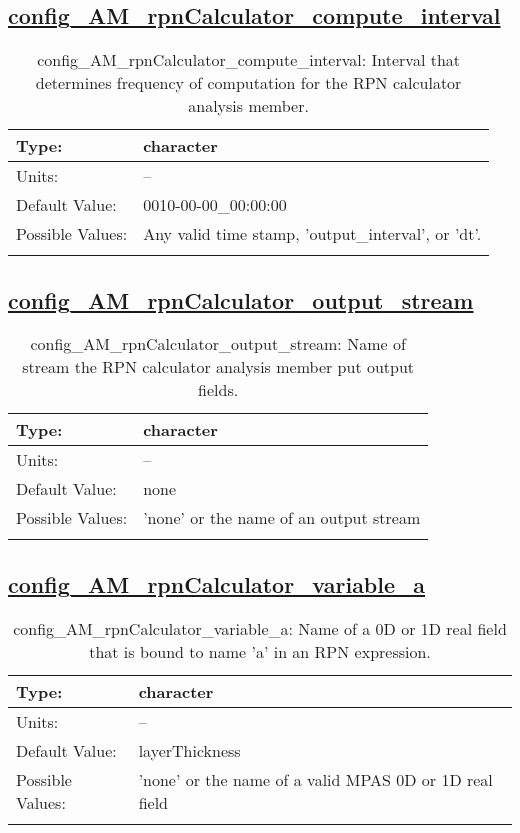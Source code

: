 \subsection[config\_AM\_rpnCalculator\_compute\_interval]{\hyperref[sec:nm_tab_AM_rpnCalculator]{config\_AM\_rpnCalculator\_compute\_interval}}
\label{subsec:nm_sec_config_AM_rpnCalculator_compute_interval}
\begin{center}
\begin{longtable}{| p{2.0in} || p{4.0in} |}
    \hline
    Type: & character \\
    \hline
    Units: & -- \\
    \hline
    Default Value: & 0010-00-00\_00:00:00 \\
    \hline
    Possible Values: & Any valid time stamp, 'output\_interval', or 'dt'. \\
    \hline
    \caption{config\_AM\_rpnCalculator\_compute\_interval: Interval that determines frequency of computation for the RPN calculator analysis member.}
\end{longtable}
\end{center}
\subsection[config\_AM\_rpnCalculator\_output\_stream]{\hyperref[sec:nm_tab_AM_rpnCalculator]{config\_AM\_rpnCalculator\_output\_stream}}
\label{subsec:nm_sec_config_AM_rpnCalculator_output_stream}
\begin{center}
\begin{longtable}{| p{2.0in} || p{4.0in} |}
    \hline
    Type: & character \\
    \hline
    Units: & -- \\
    \hline
    Default Value: & none \\
    \hline
    Possible Values: & 'none' or the name of an output stream \\
    \hline
    \caption{config\_AM\_rpnCalculator\_output\_stream: Name of stream the RPN calculator analysis member put output fields.}
\end{longtable}
\end{center}
\subsection[config\_AM\_rpnCalculator\_variable\_a]{\hyperref[sec:nm_tab_AM_rpnCalculator]{config\_AM\_rpnCalculator\_variable\_a}}
\label{subsec:nm_sec_config_AM_rpnCalculator_variable_a}
\begin{center}
\begin{longtable}{| p{2.0in} || p{4.0in} |}
    \hline
    Type: & character \\
    \hline
    Units: & -- \\
    \hline
    Default Value: & layerThickness \\
    \hline
    Possible Values: & 'none' or the name of a valid MPAS 0D or 1D real field \\
    \hline
    \caption{config\_AM\_rpnCalculator\_variable\_a: Name of a 0D or 1D real field that is bound to name 'a' in an RPN expression.}
\end{longtable}
\end{center}
